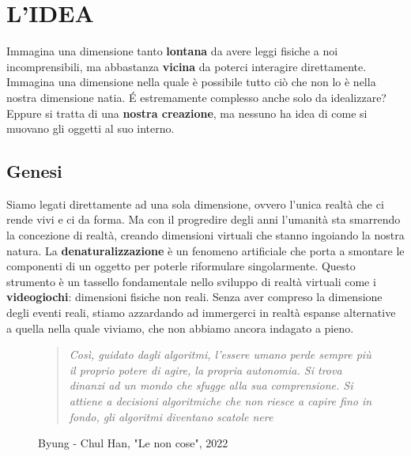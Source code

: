\section{L'IDEA}
Immagina una dimensione tanto \textbf{lontana} da avere leggi fisiche a noi incomprensibili, ma abbastanza \textbf{vicina} da poterci interagire direttamente. Immagina una dimensione nella quale è possibile tutto ciò che non lo è nella nostra dimensione natia. É estremamente complesso anche solo da idealizzare? Eppure si tratta di una \textbf{nostra creazione}, ma nessuno ha idea di come si muovano gli oggetti al suo interno.
	
	\subsection{Genesi}
	Siamo legati direttamente ad una sola dimensione, ovvero l'unica realtà che ci rende vivi e ci da forma. Ma con il progredire degli anni l'umanità sta smarrendo la concezione di realtà, creando dimensioni virtuali che stanno ingoiando la nostra natura.
	La \textbf{denaturalizzazione} è un fenomeno artificiale che porta a smontare le componenti di un oggetto per poterle riformulare singolarmente. Questo strumento è un tassello fondamentale nello sviluppo di realtà virtuali come i \textbf{videogiochi}: dimensioni fisiche non reali.
	Senza aver compreso la dimensione degli eventi reali, stiamo azzardando ad immergerci in realtà espanse alternative a quella nella quale viviamo, che non abbiamo ancora indagato a pieno.
	
	\begin{figure}[h] %
		\begin{quote}
			\textit{Così, guidato dagli algoritmi, l'essere umano perde sempre più il proprio potere di agire, la propria autonomia. Si trova dinanzi ad un mondo che sfugge alla sua comprensione. Si attiene a decisioni algoritmiche che non riesce a capire fino in fondo, gli algoritmi diventano scatole nere}
		\end{quote}
		\caption{Byung - Chul Han, "Le non cose", 2022}
	\end{figure}
	
